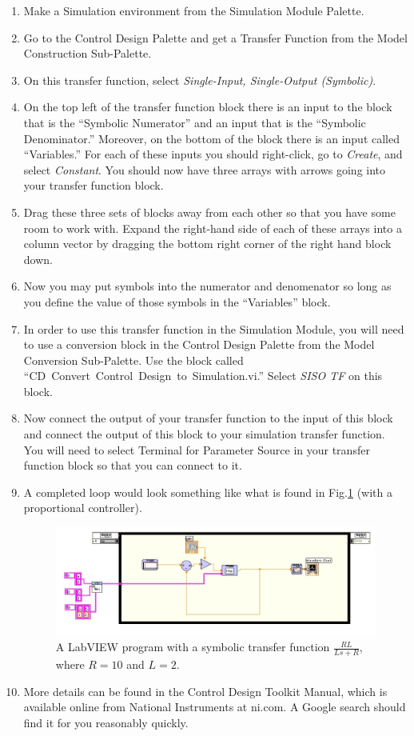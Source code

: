 \begin{enumerate}
\item Make a Simulation environment from the Simulation Module Palette.
\item Go to the Control Design Palette and get a Transfer Function from the
  Model Construction Sub-Palette.  
\item On this transfer function, select \emph{Single-Input, Single-Output (Symbolic)}.
\item On the top left of the transfer function block there is an input to the
  block that is the ``Symbolic Numerator'' and an input that is the ``Symbolic
  Denominator.''  Moreover, on the bottom of the block there is an input called
  ``Variables.''  For each of these inputs you should right-click, go to
  \emph{Create}, and select \emph{Constant}.  You should now have three arrays
  with arrows going into your transfer function block.
\item Drag these three sets of blocks away from each other so that you have some
  room to work with.  Expand the right-hand side of each of these arrays into a
  column vector by dragging the bottom right corner of the right hand block
  down.
\item Now you may put symbols into the numerator and denomenator so long as you
  define the value of those symbols in the ``Variables'' block.
\item In order to use this transfer function in the Simulation Module, you will
  need to use a conversion block in the Control Design Palette from the Model
  Conversion Sub-Palette.  Use the block called
  ``CD~Convert~Control~Design~to~Simulation.vi.''  Select \emph{SISO TF} on this
  block.  
\item Now connect the output of your transfer function to the input of this
  block and connect the output of this block to your simulation transfer
  function.  You will need to select Terminal for Parameter Source in your
  transfer function block so that you can connect to it.  
\item A completed loop would look something like what is found in
  Fig.\ref{fig-symboliclabview} (with a proportional controller).
\begin{figure}[t!]
\centering
\includegraphics[width=6in]{symbolic/SymbolicTF}
\caption{A LabVIEW program with a symbolic transfer function $\frac{RL}{Ls+R}$,
  where $R=10$ and $L=2$.}
\label{fig-symboliclabview}
\end{figure}
\item More details can be found in the Control Design Toolkit Manual, which is
  available online from National Instruments at ni.com.  A Google search should
  find it for you reasonably quickly.  
\end{enumerate}
